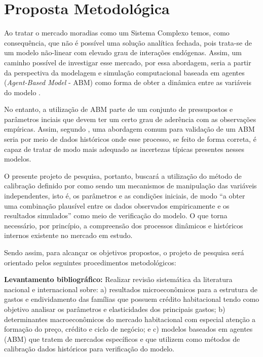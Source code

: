 \section{Proposta Metodológica}
\label{sec:proposta-metodologica}

Ao tratar o mercado moradias como um Sistema Complexo temos, como consequência, que não é possível uma solução analítica fechada, pois trata-se de um modelo não-linear com elevado grau de interações endógenas. Assim, um caminho possível de investigar esse mercado, por essa abordagem, seria a partir da perspectiva da modelagem e simulação computacional baseada em agentes (\textit{Agent-Based Model} - ABM) como forma de obter a dinâmica entre as variáveis do modelo \cite{AXELROD1997}.

No entanto, a utilização de ABM parte de um conjunto de pressupostos e parâmetros inciais que devem ter um certo grau de aderência com as observações empíricas. Assim, segundo , uma abordagem comum para validação de um ABM seria por meio de dados históricos onde esse processo, se feito de forma correta, é capaz de tratar de modo mais adequado as incertezas típicas presentes nesses modelos.

O presente projeto de pesquisa, portanto, buscará a utilização do método de calibração definido por  como sendo um mecanismos de manipulação das variáveis independentes, isto é, os parâmetros e as condições iniciais, de modo \enquote{a obter uma combinação plausível entre os dados observados empiricamente e os resultados simulados} como meio de verificação do modelo. O que torna necessário, por princípio, a compreensão dos processos dinâmicos e históricos internos existente no mercado em estudo.

Sendo assim, para alcançar os objetivos propostos, o projeto de pesquisa será orientado pelos seguintes procedimentos metodológicos:

\textbf{Levantamento bibliográfico:} Realizar revisão sistemática da literatura nacional e internacional sobre: a) resultados microeconômicos para a estrutura de gastos e endividamento das famílias que possuem crédito habitacional tendo como objetivo analisar os parâmetros e elasticidades dos principais gastos; b) determinantes macroeconômicos do mercado habitacional com especial atenção a formação do preço, crédito e ciclo de negócio; e c) modelos baseados em agentes (ABM) que tratem de mercados específicos e que utilizem como métodos de calibração dados históricos para verificação do modelo.

